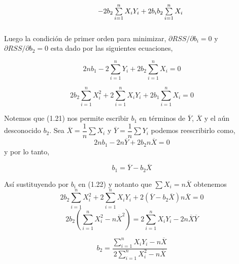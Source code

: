\begin{multicols}{2}
\begin{equation}
\begin{tabular}{rcl}
	     &&$- 2b_2 \sum\limits_{i=1}^n X_iY_i + 2b_i b_2 \sum\limits_{i=1}^n X_i$\\\\
    \end{tabular}
\end{equation}
Luego la condición de primer orden para minimizar, $\partial RSS / \partial b_i = 0$ y $\partial RSS / \partial b_2 = 0$ esta dado por las siguientes ecuaciones,
\begin{tcolorbox}[colframe = white]
    \begin{equation}
	2nb_1 - 2\sum\limits_{i=1}^n Y_i + 2b_2\sum\limits_{i=1}^n X_i = 0
    \end{equation}
\end{tcolorbox}
\begin{tcolorbox}[colframe = white]
    \begin{equation}
	2b_2\sum\limits_{i=1}^n X_i^2 + 2\sum\limits_{i=1}^n X_iY_i + 2b_1\sum\limits_{i=1}^n X_i = 0
    \end{equation}
\end{tcolorbox}

Notemos que (1.21) nos permite escribir $b_1$ en términos de $\overline{Y}$, $\overline{X}$ y el aún desconocido $b_2$. Sea $\overline{X}=\dfrac{1}{n}\sum X_i$ y $\overline{Y} = \dfrac{1}{n}\sum Y_i$ podemos reescribirlo como,
\begin{equation}
    2nb_1 - 2n\overline{Y} + 2b_2n\overline{X} = 0
\end{equation}
y por lo tanto,\\
\begin{tcolorbox}[colframe = white]
    \begin{equation}
	b_1 = \overline{Y} - b_2\overline{X}
    \end{equation}
\end{tcolorbox}
Así sustituyendo por $b_i$ en (1.22) y notanto que $\sum X_i = n\overline{X}$ obtenemos
\begin{equation}
    2b_2 \sum\limits_{i=1}^n X_i^2 + 2\sum\limits_{i=1}^n X_iY_i + 2\left(\overline{Y} - b_2 \overline{X}\right) n\overline{X} = 0
\end{equation}
\begin{equation}
    2b_2\left(\sum\limits_{i=1}^n X_i^2 -n\overline{X}^2 \right) = 2\sum\limits_{i=1}^n X_i Y_i - 2n\overline{X}\overline{Y}
\end{equation}
\begin{tcolorbox}[colframe = white]
    \begin{equation}
	b_2 = \dfrac{\sum\limits_{i=1}^n X_iY_i - n\overline{X}}{2\sum\limits_{i=1}^n X_i^2 - n\overline{X}}
    \end{equation}
\end{tcolorbox}


\end{multicols}
